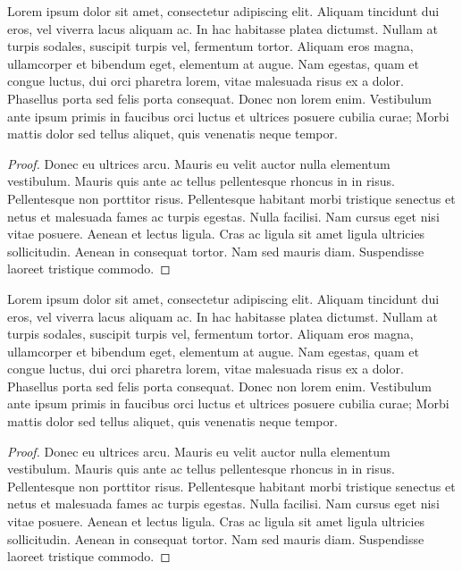 \documentclass{article}
\theoremstyle{definition} \newtheorem{definition}{Definition}[section]
\theoremstyle{plain} \newtheorem{proposition}{Proposition}[section]
\theoremstyle{remark} \newtheorem{example}{Example}[section]
\theoremstyle{plain} \newtheorem{theorem}{Theorem}[section]
\newenvironment{tcbproblem}[1]{
    \begin{tcolorbox}[title = {Problem #1}]
    }{
    \end{tcolorbox}
}
\begin{document}
    \begin{tcbproblem}{A2.1}
        Lorem ipsum dolor sit amet, consectetur adipiscing elit. Aliquam tincidunt dui eros, vel viverra lacus aliquam ac. In hac habitasse platea dictumst. Nullam at turpis sodales, suscipit turpis vel, fermentum tortor. Aliquam eros magna, ullamcorper et bibendum eget, elementum at augue. Nam egestas, quam et congue luctus, dui orci pharetra lorem, vitae malesuada risus ex a dolor. Phasellus porta sed felis porta consequat. Donec non lorem enim. Vestibulum ante ipsum primis in faucibus orci luctus et ultrices posuere cubilia curae; Morbi mattis dolor sed tellus aliquet, quis venenatis neque tempor.
    \end{tcbproblem}
    \begin{proof}[Proof]
        Donec eu ultrices arcu. Mauris eu velit auctor nulla elementum vestibulum. Mauris quis ante ac tellus pellentesque rhoncus in in risus. Pellentesque non porttitor risus. Pellentesque habitant morbi tristique senectus et netus et malesuada fames ac turpis egestas. Nulla facilisi. Nam cursus eget nisi vitae posuere. Aenean et lectus ligula. Cras ac ligula sit amet ligula ultricies sollicitudin. Aenean in consequat tortor. Nam sed mauris diam. Suspendisse laoreet tristique commodo.
    \end{proof}

    \begin{tcbproblem}{A2.2}
        Lorem ipsum dolor sit amet, consectetur adipiscing elit. Aliquam tincidunt dui eros, vel viverra lacus aliquam ac. In hac habitasse platea dictumst. Nullam at turpis sodales, suscipit turpis vel, fermentum tortor. Aliquam eros magna, ullamcorper et bibendum eget, elementum at augue. Nam egestas, quam et congue luctus, dui orci pharetra lorem, vitae malesuada risus ex a dolor. Phasellus porta sed felis porta consequat. Donec non lorem enim. Vestibulum ante ipsum primis in faucibus orci luctus et ultrices posuere cubilia curae; Morbi mattis dolor sed tellus aliquet, quis venenatis neque tempor.
    \end{tcbproblem}
    \begin{proof}[Proof]
        Donec eu ultrices arcu. Mauris eu velit auctor nulla elementum vestibulum. Mauris quis ante ac tellus pellentesque rhoncus in in risus. Pellentesque non porttitor risus. Pellentesque habitant morbi tristique senectus et netus et malesuada fames ac turpis egestas. Nulla facilisi. Nam cursus eget nisi vitae posuere. Aenean et lectus ligula. Cras ac ligula sit amet ligula ultricies sollicitudin. Aenean in consequat tortor. Nam sed mauris diam. Suspendisse laoreet tristique commodo.
    \end{proof}
\end{document}
